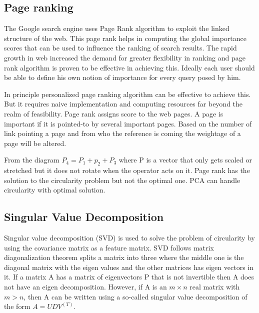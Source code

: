 \documentclass{bmcart}
\begin{document}
\subsection{Page ranking}
\label{ssec:pageRank}

The Google search engine uses Page Rank algorithm to exploit the linked structure of the web. This page rank helps in computing the global importance scores that can be used to influence the ranking of search results. The rapid growth in web increased the demand for greater flexibility in ranking and page rank algorithm is proven to be effective in achieving this. Ideally each user should be able to define his own notion of importance for every query posed by him. 

In principle personalized page ranking algorithm can be effective to achieve this. But it requires naive implementation and computing resources far beyond the realm of feasibility. Page rank assigns score to the web pages. A page is important if it is pointed-to by several important pages. Based on the number of link pointing a page and from who the reference is coming the weightage of a page will be altered. 


From the diagram $P_4 = P_1 + p_2 + P_3$ where P is a vector that only gets scaled or stretched but it does not rotate when the operator acts on it.  Page rank has the solution to the circularity problem but not the optimal one. PCA can handle circularity with optimal solution. 

\subsection{Singular Value Decomposition}
\label{ssec:svd}

Singular value decomposition (SVD) is used to solve the problem of circularity by using the covariance matrix as a feature matrix. SVD follows matrix diagonalization theorem splits a matrix into three where the middle one is the diagonal matrix with the eigen values and the other matrices has eigen vectors in it. If a matrix A has a matrix of eigenvectors P that is not invertible  then  A does not have an eigen decomposition. However, if A is an $m \times n$ real matrix with $ m > n$, then A can be written using a so-called singular value decomposition of the form $A=UDV^(T)$. 
\end{document}

